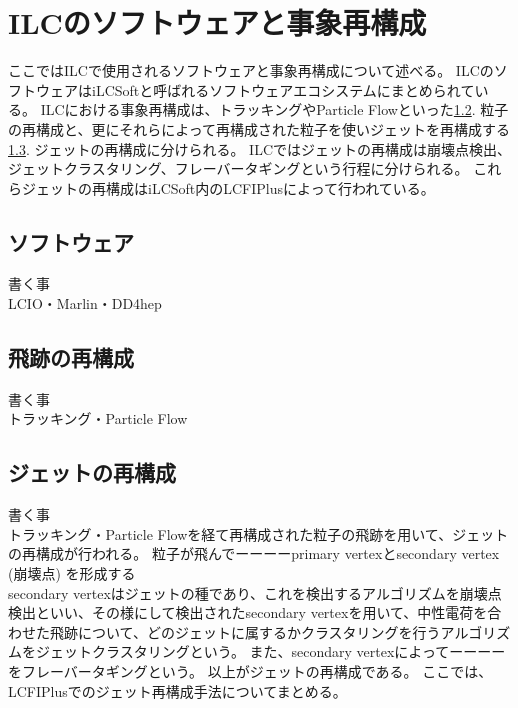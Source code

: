 \section{ILCのソフトウェアと事象再構成} \label{Intro:SoftwareandEventReconstructionofILC}

ここではILCで使用されるソフトウェアと事象再構成について述べる。
ILCのソフトウェアはiLCSoft\cite{iLCSoft}と呼ばれるソフトウェアエコシステムにまとめられている。
ILCにおける事象再構成は、トラッキングやParticle Flowといった\ref{Intro:SoftERILC:ParticleReconstruction}. 粒子の再構成と、更にそれらによって再構成された粒子を使いジェットを再構成する\ref{Intro:SoftERILC:JetReconstruction}. ジェットの再構成に分けられる。
ILCではジェットの再構成は崩壊点検出、ジェットクラスタリング、フレーバータギングという行程に分けられる。
これらジェットの再構成はiLCSoft内のLCFIPlus\cite{LCFIPlus}によって行われている。

\subsection{ソフトウェア} \label{Intro:SoftERILC:Software}

書く事\\
LCIO・Marlin・DD4hep\\


\subsection{飛跡の再構成} \label{Intro:SoftERILC:ParticleReconstruction}

書く事\\
トラッキング・Particle Flow\\

\subsection{ジェットの再構成} \label{Intro:SoftERILC:JetReconstruction}

書く事\\
トラッキング・Particle Flowを経て再構成された粒子の飛跡を用いて、ジェットの再構成が行われる。
粒子が飛んでーーーーprimary vertexとsecondary vertex　(崩壊点) を形成する\\
secondary vertexはジェットの種であり、これを検出するアルゴリズムを崩壊点検出といい、その様にして検出されたsecondary vertexを用いて、中性電荷を合わせた飛跡について、どのジェットに属するかクラスタリングを行うアルゴリズムをジェットクラスタリングという。
また、secondary vertexによってーーーーをフレーバータギングという。
以上がジェットの再構成である。
ここでは、LCFIPlus\cite{LCFIPlusPaper}でのジェット再構成手法についてまとめる。

